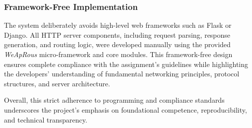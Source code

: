 \subsubsection{Framework-Free Implementation}
The system deliberately avoids high-level web frameworks such as Flask or Django. 
All HTTP server components, including request parsing, response generation, and routing logic, were developed manually using the provided \textit{WeApRous} micro-framework and core modules. 
This framework-free design ensures complete compliance with the assignment’s guidelines while highlighting the developers’ understanding of fundamental networking principles, protocol structures, and server architecture.

Overall, this strict adherence to programming and compliance standards underscores the project’s emphasis on foundational competence, reproducibility, and technical transparency.
